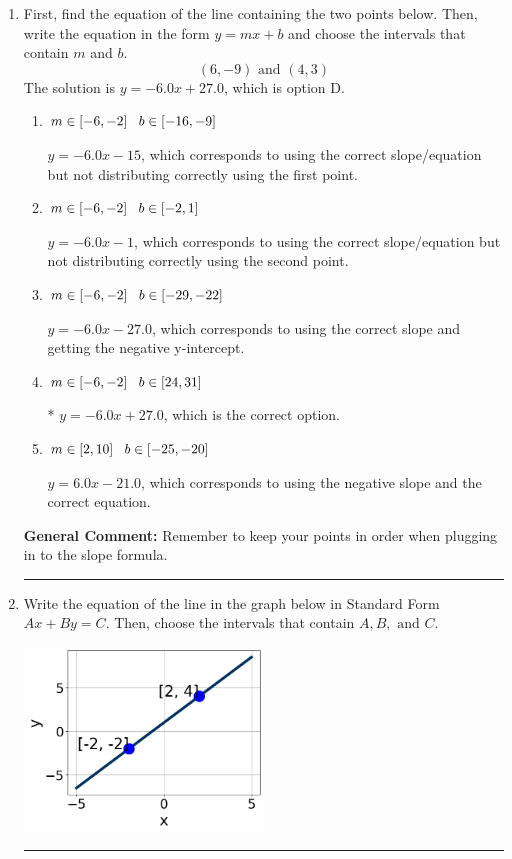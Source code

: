 \documentclass{extbook}[14pt]
\newcommand{\litem}[1]{\item #1

\rule{\textwidth}{0.4pt}}
\begin{document}
\begin{enumerate}\litem{
First, find the equation of the line containing the two points below. Then, write the equation in the form $ y=mx+b $ and choose the intervals that contain $m$ and $b$.
\[ (6, -9) \text{ and } (4, 3) \]The solution is \( y = -6.0x + 27.0 \), which is option D.\begin{enumerate}[label=\Alph*.]
\item \( m \in [-6, -2] \hspace*{3mm} b \in [-16, -9] \)

 $y = -6.0x -15$, which corresponds to using the correct slope/equation but not distributing correctly using the first point.
\item \( m \in [-6, -2] \hspace*{3mm} b \in [-2, 1] \)

 $y = -6.0x -1$, which corresponds to using the correct slope/equation but not distributing correctly using the second point.
\item \( m \in [-6, -2] \hspace*{3mm} b \in [-29, -22] \)

 $y = -6.0x -27.0$, which corresponds to using the correct slope and getting the negative y-intercept.
\item \( m \in [-6, -2] \hspace*{3mm} b \in [24, 31] \)

* $y = -6.0x + 27.0$, which is the correct option.
\item \( m \in [2, 10] \hspace*{3mm} b \in [-25, -20] \)

 $y = 6.0x -21.0$, which corresponds to using the negative slope and the correct equation.
\end{enumerate}

\textbf{General Comment:} Remember to keep your points in order when plugging in to the slope formula.
}
\litem{
Write the equation of the line in the graph below in Standard Form $Ax+By=C$. Then, choose the intervals that contain $A, B, \text{ and } C$.

\begin{center}
    \includegraphics[width=0.5\textwidth]{../Figures/linearGraphToStandardCopyA.png}
\end{center}


}
\end{enumerate}
\end{document}
